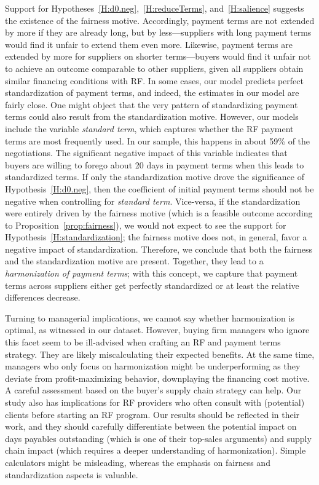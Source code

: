\documentclass[a4paper,11pt]{article}
\renewcommand{\~}[1]{\tilde{#1}}
\renewcommand{\-}[1]{\overline{#1}}
\begin{document}
Support for Hypotheses~\ref{H:d0.neg},~\ref{H:reduceTerms}, and~\ref{H:salience} suggests the existence of the fairness motive. Accordingly, payment terms are not extended by more if they are already long, but by less---suppliers with long payment terms would find it unfair to extend them even more. Likewise, payment terms are extended by more for suppliers on shorter terms---buyers would find it unfair not to achieve an outcome comparable to other suppliers, given all suppliers obtain similar financing conditions with RF. In some cases, our model predicts perfect standardization of payment terms, and indeed, the estimates in our model are fairly close. One might object that the very pattern of standardizing payment terms could also result from the standardization motive. However, our models include the variable \textit{standard term}, which captures whether the RF payment terms are most frequently used. In our sample, this happens in about 59\% of the negotiations. The significant negative impact of this variable indicates that buyers are willing to forego about 20 days in payment terms when this leads to standardized terms. If only the standardization motive drove the significance of Hypothesis~\ref{H:d0.neg}, then the coefficient of initial payment terms should not be negative when controlling for \textit{standard term}. Vice-versa, if the standardization were entirely driven by the fairness motive (which is a feasible outcome according to Proposition~\ref{prop:fairness}), we would not expect to see the support for Hypothesis~\ref{H:standardization}; the fairness motive does not, in general, favor a negative impact of standardization. Therefore, we conclude that both the fairness and the standardization motive are present. Together, they lead to a \textit{harmonization of payment terms}; with this concept, we capture that payment terms across suppliers either get perfectly standardized or at least the relative differences decrease. 

Turning to managerial implications, we cannot say whether harmonization is optimal, as witnessed in our dataset. However, buying firm managers who ignore this facet seem to be ill-advised when crafting an RF and payment terms strategy. They are likely miscalculating their expected benefits. At the same time, managers who only focus on harmonization might be underperforming as they deviate from profit-maximizing behavior, downplaying the financing cost motive. A careful assessment based on the buyer's supply chain strategy can help. Our study also has implications for RF providers who often consult with (potential) clients before starting an RF program. Our results should be reflected in their work, and they should carefully differentiate between the potential impact on days payables outstanding (which is one of their top-sales arguments) and supply chain impact (which requires a deeper understanding of harmonization). Simple calculators might be misleading, whereas the emphasis on fairness and standardization aspects is valuable.
\end{document}
